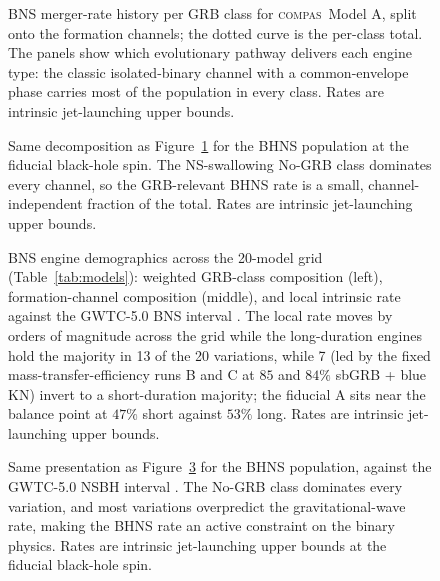 \documentclass[twocolumn,apj]{openjournal}
\newcommand{\compas}{\textsc{compas}}
\begin{document}
\begin{figure}[!tbp]
\caption{BNS merger-rate history per GRB class for \compas\ Model A, split
onto the \citet{broekgaarden2021} formation channels; the dotted curve is the
per-class total. The panels show which evolutionary pathway delivers each
engine type: the classic isolated-binary channel with a common-envelope phase
carries most of the population in every class. Rates are intrinsic
jet-launching upper bounds. \label{fig:ratechanbns}}
\end{figure}

\begin{figure}[!tbp]
\caption{Same decomposition as Figure~\ref{fig:ratechanbns} for the BHNS
population at the fiducial black-hole spin. The NS-swallowing No-GRB class
dominates every channel, so the GRB-relevant BHNS rate is a small,
channel-independent fraction of the total. Rates are intrinsic jet-launching
upper bounds. \label{fig:ratechanbhns}}
\end{figure}

\begin{figure}[!tbp]
\caption{BNS engine demographics across the 20-model
\citet{broekgaarden2021} grid (Table~\ref{tab:models}): weighted GRB-class
composition (left), formation-channel composition (middle), and local
intrinsic rate against the GWTC-5.0 BNS interval \citep[right;][Table~2, the
union of their FullPop and PixelPop $90\%$ credible intervals]{abac2026}.
The local rate moves by orders of magnitude across the grid while the
long-duration engines hold the majority in 13 of the 20 variations, while 7
(led by the fixed mass-transfer-efficiency runs B and C at $85$ and $84\%$
sbGRB + blue KN) invert to a short-duration majority; the fiducial A sits near
the balance point at $47\%$ short against $53\%$ long. Rates are
intrinsic jet-launching upper bounds. \label{fig:frac20bns}}
\end{figure}

\begin{figure}[!tbp]
\caption{Same presentation as Figure~\ref{fig:frac20bns} for the BHNS
population, against the GWTC-5.0 NSBH interval \citep[][Table~2, constructed as
in Figure~\ref{fig:frac20bns}]{abac2026}. The
No-GRB class dominates every variation, and most variations overpredict the
gravitational-wave rate, making the BHNS rate an active constraint on the
binary physics. Rates are intrinsic jet-launching upper bounds at the
fiducial black-hole spin. \label{fig:frac20bhns}}
\end{figure}
\end{document}

